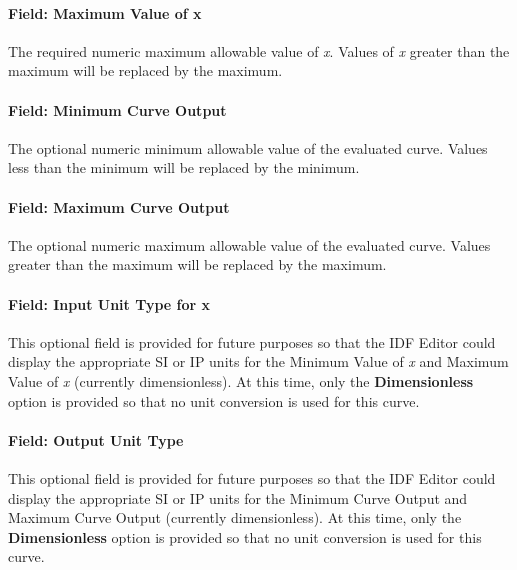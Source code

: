 \paragraph{Field: Maximum Value of x}\label{field-maximum-value-of-x-16}

The required numeric maximum allowable value of \emph{x}. Values of \emph{x} greater than the maximum will be replaced by the maximum.

\paragraph{Field: Minimum Curve Output}\label{field-minimum-curve-output-15}

The optional numeric minimum allowable value of the evaluated curve. Values less than the minimum will be replaced by the minimum.

\paragraph{Field: Maximum Curve Output}\label{field-maximum-curve-output-14}

The optional numeric maximum allowable value of the evaluated curve. Values greater than the maximum will be replaced by the maximum.

\paragraph{Field: Input Unit Type for x}\label{field-input-unit-type-for-x-15}

This optional field is provided for future purposes so that the IDF Editor could display the appropriate SI or IP units for the Minimum Value of \emph{x} and Maximum Value of \emph{x} (currently dimensionless). At this time, only the \textbf{Dimensionless} option is provided so that no unit conversion is used for this curve.

\paragraph{Field: Output Unit Type}\label{field-output-unit-type-14}

This optional field is provided for future purposes so that the IDF Editor could display the appropriate SI or IP units for the Minimum Curve Output and Maximum Curve Output (currently dimensionless). At this time, only the \textbf{Dimensionless} option is provided so that no unit conversion is used for this curve.

